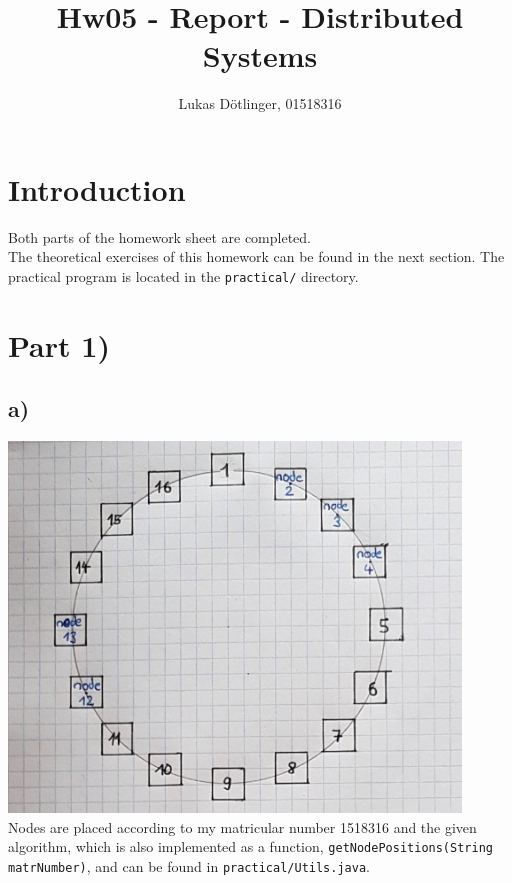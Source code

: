 \documentclass{article}
\begin{document}
  \title{Hw05 - Report - Distributed Systems}
  \date{}
  \author{Lukas Dötlinger, 01518316}
	
  \maketitle
  
  \section*{Introduction}
  
  	Both parts of the homework sheet are completed.\\
  	The theoretical exercises of this homework can be found in the next section. The practical program is located in the \texttt{practical/} directory.\\
  	
  \section*{Part 1)}
  
    \subsection*{a)}
    
      \includegraphics[width=12cm]{chord-drawing.png} \\
      
      Nodes are placed according to my matricular number 1518316 and the given algorithm, which is also implemented as a function, \texttt{getNodePositions(String matrNumber)}, and can be found in \texttt{practical/Utils.java}.\\
      
\end{document}
